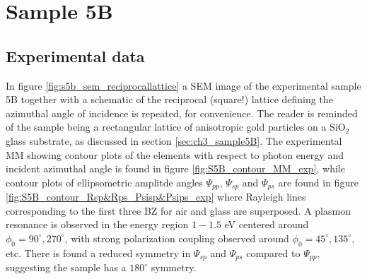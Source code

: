 \clearpage
\section{Sample 5B}
\subsection{Experimental data}
\label{sec:S5B_expdata_results}
In figure \ref{fig:s5b_sem_reciprocallattice} a SEM image of the experimental sample 5B together with a schematic of the reciprocal (square!) lattice defining the azimuthal angle of incidence is repeated, for convenience. The reader is reminded of the sample being a rectangular lattice of anisotropic gold particles on a SiO$_2$ glass substrate, as discussed in section \ref{sec:ch3_sample5B}. The experimental MM showing contour plots of the elements with respect to photon energy and incident azimuthal angle is found in figure \ref{fig:S5B_contour_MM_exp}, while contour plots of ellipsometric amplitde angles $\Psi_{pp}$, $\Psi_{sp}$ and $\Psi_{ps}$ are found in figure \ref{fig:S5B_contour_Rsp&Rps_Psisp&Psips_exp} where Rayleigh lines corresponding to the first three BZ for air and glass are superposed. A plasmon resonance is observed in the energy region $1-1.5$ eV centered around $\phi_0=90^\circ, 270^\circ$, with strong polarization coupling observed around $\phi_0=45^\circ, 135^\circ$, etc. There is found a reduced symmetry in $\Psi_{sp}$ and $\Psi_{ps}$ compared to $\Psi_{pp}$, suggesting the sample has a $180^\circ$ symmetry.
